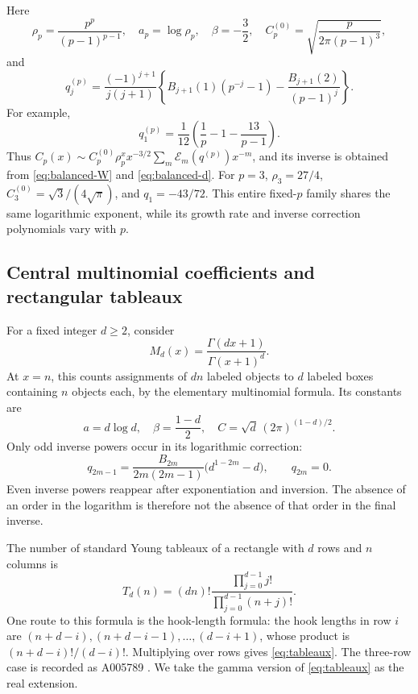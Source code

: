 \documentclass[11pt,a4paper]{article}
\numberwithin{equation}{section}
\theoremstyle{definition}
\theoremstyle{remark}
\newcommand{\cE}{\mathcal E}
\begin{document}
Here
\begin{equation}
 \rho_p=\frac{p^p}{(p-1)^{p-1}},\quad
 a_p=\log\rho_p,\quad \beta=-\frac32,\quad
 C_p^{(0)}=\sqrt{\frac{p}{2\pi(p-1)^3}},
 \label{eq:fuss-constants}
\end{equation}
and
\begin{equation}
 q_j^{(p)}=\frac{(-1)^{j+1}}{j(j+1)}
 \left\{B_{j+1}(1)(p^{-j}-1)
             -\frac{B_{j+1}(2)}{(p-1)^j}\right\}.
 \label{eq:fuss-q}
\end{equation}
For example,
\[
 q_1^{(p)}=\frac1{12}\left(\frac1p-1-\frac{13}{p-1}\right).
\]
Thus $C_p(x)\sim C_p^{(0)}\rho_p^x x^{-3/2}\sum_m\cE_m(q^{(p)})x^{-m}$, and its inverse is obtained from \eqref{eq:balanced-W} and \eqref{eq:balanced-d}. For $p=3$, $\rho_3=27/4$, $C_3^{(0)}=\sqrt3/(4\sqrt\pi)$, and $q_1=-43/72$. This entire fixed-$p$ family shares the same logarithmic exponent, while its growth rate and inverse correction polynomials vary with $p$.

\subsection{Central multinomial coefficients and rectangular tableaux}

For a fixed integer $d\ge2$, consider
\begin{equation}
 M_d(x)=\frac{\Gamma(dx+1)}{\Gamma(x+1)^d}.
 \label{eq:multinomial}
\end{equation}
At $x=n$, this counts assignments of $dn$ labeled objects to $d$ labeled boxes containing $n$ objects each, by the elementary multinomial formula. Its constants are
\begin{equation}
 a=d\log d,\quad \beta=\frac{1-d}{2},\quad
 C=\sqrt d\,(2\pi)^{(1-d)/2}.
 \label{eq:multi-constants}
\end{equation}
Only odd inverse powers occur in its logarithmic correction:
\begin{equation}
 q_{2m-1}=\frac{B_{2m}}{2m(2m-1)}
                 \bigl(d^{1-2m}-d\bigr),\qquad q_{2m}=0.
 \label{eq:multi-q}
\end{equation}
Even inverse powers reappear after exponentiation and inversion. The absence of an order in the logarithm is therefore not the absence of that order in the final inverse.

The number of standard Young tableaux of a rectangle with $d$ rows and $n$ columns is
\begin{equation}
 T_d(n)=(dn)!\frac{\prod_{j=0}^{d-1}j!}{\prod_{j=0}^{d-1}(n+j)!}.
 \label{eq:tableaux}
\end{equation}
One route to this formula is the hook-length formula: the hook lengths in row $i$ are $(n+d-i),(n+d-i-1),\ldots,(d-i+1)$, whose product is $(n+d-i)!/(d-i)!$. Multiplying over rows gives \eqref{eq:tableaux}. The three-row case is recorded as A005789 \cite{oeistableaux}. We take the gamma version of \eqref{eq:tableaux} as the real extension.
\end{document}

